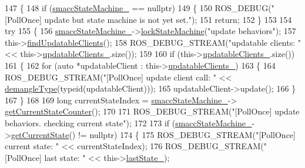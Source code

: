 \begin{DoxyCode}
147 \{
148     \textcolor{keywordflow}{if} (\hyperlink{classsmacc_1_1SignalDetector_a46025de6ac7b5980e22144f9703236a4}{smaccStateMachine\_} == \textcolor{keyword}{nullptr})
149     \{
150         ROS\_DEBUG(\textcolor{stringliteral}{"[PollOnce] update but state machine is not yet set."});
151         \textcolor{keywordflow}{return};
152     \}
153 
154     \textcolor{keywordflow}{try}
155     \{
156         \hyperlink{classsmacc_1_1SignalDetector_a46025de6ac7b5980e22144f9703236a4}{smaccStateMachine\_}->\hyperlink{classsmacc_1_1ISmaccStateMachine_a5c8d4c9a4b11c7950266a00e48080ce3}{lockStateMachine}(\textcolor{stringliteral}{"update behaviors"});
157         this->\hyperlink{classsmacc_1_1SignalDetector_a47ec2df560e2e33758ce3975bece9385}{findUpdatableClients}();
158         ROS\_DEBUG\_STREAM(\textcolor{stringliteral}{"updatable clients: "} << this->\hyperlink{classsmacc_1_1SignalDetector_a01a457b4ec935473d6426efb7b87e683}{updatableClients\_}.size());
159 
160         \textcolor{keywordflow}{if} (this->\hyperlink{classsmacc_1_1SignalDetector_a01a457b4ec935473d6426efb7b87e683}{updatableClients\_}.size())
161         \{
162             \textcolor{keywordflow}{for} (\textcolor{keyword}{auto} *updatableClient : this->\hyperlink{classsmacc_1_1SignalDetector_a01a457b4ec935473d6426efb7b87e683}{updatableClients\_})
163             \{
164                 ROS\_DEBUG\_STREAM(\textcolor{stringliteral}{"[PollOnce] update client call:  "} << 
      \hyperlink{namespacesmacc_1_1introspection_a670e39ccea29952859df4e2d0e45077b}{demangleType}(\textcolor{keyword}{typeid}(updatableClient)));
165                 updatableClient->update();
166             \}
167         \}
168 
169         \textcolor{keywordtype}{long} currentStateIndex = \hyperlink{classsmacc_1_1SignalDetector_a46025de6ac7b5980e22144f9703236a4}{smaccStateMachine\_}->
      \hyperlink{classsmacc_1_1ISmaccStateMachine_aad27c0182b53245d0aded22e63cd83bd}{getCurrentStateCounter}();
170 
171         ROS\_DEBUG\_STREAM(\textcolor{stringliteral}{"[PollOnce] update behaviors. checking current state"});
172 
173         \textcolor{keywordflow}{if} (\hyperlink{classsmacc_1_1SignalDetector_a46025de6ac7b5980e22144f9703236a4}{smaccStateMachine\_}->\hyperlink{classsmacc_1_1ISmaccStateMachine_a610d09dc5341fb63732be713c21fbe86}{getCurrentState}() != \textcolor{keyword}{nullptr})
174         \{
175             ROS\_DEBUG\_STREAM(\textcolor{stringliteral}{"[PollOnce] current state: "} << currentStateIndex);
176             ROS\_DEBUG\_STREAM(\textcolor{stringliteral}{"[PollOnce] last state: "} << this->\hyperlink{classsmacc_1_1SignalDetector_a72293ed0e98f4200fbe75b53f1e41eab}{lastState\_});

\end{DoxyCode}

